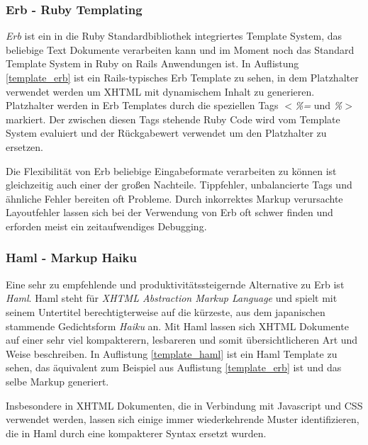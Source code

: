 \subsubsection{Erb - Ruby Templating}

\textit{Erb} ist ein in die Ruby Standardbibliothek integriertes
Template System, das beliebige Text Dokumente verarbeiten kann und im
Moment noch das Standard Template System in Ruby on Rails Anwendungen
ist. In Auflistung \ref{template_erb} ist ein Rails-typisches Erb
Template zu sehen, in dem Platzhalter verwendet werden um XHTML mit
dynamischem Inhalt zu generieren. Platzhalter werden in Erb Templates
durch die speziellen Tags \textit{$<$\%=} und \textit{\%$>$}
markiert. Der zwischen diesen Tags stehende Ruby Code wird vom
Template System evaluiert und der Rückgabe\-wert verwendet um den
Platzhalter zu ersetzen.



Die Flexibilität von Erb beliebige Eingabeformate verarbeiten zu
können ist gleichzeitig auch einer der großen Nachteile. Tippfehler,
unbalancierte Tags und ähnliche Fehler bereiten oft Probleme. Durch
inkorrektes Markup verursachte Layoutfehler lassen sich bei der
Verwendung von Erb oft schwer finden und erforden meist ein
zeitaufwendiges Debugging.

\subsubsection{Haml - Markup Haiku}

Eine sehr zu empfehlende und produktivitätssteigernde Alternative zu
Erb ist \textit{Haml}. Haml steht für \textit{XHTML Abstraction Markup
  Language} und spielt mit seinem Untertitel berechtigterweise auf die
kürzeste, aus dem japanischen stammende Gedichtsform \textit{Haiku}
an. Mit Haml lassen sich XHTML Dokumente auf einer sehr viel
kompakterern, lesbareren und somit übersichtlicheren Art und Weise
beschreiben. In Auflistung \ref{template_haml} ist ein Haml Template
zu sehen, das äquivalent zum Beispiel aus Auflistung
\ref{template_erb} ist und das selbe Markup generiert.



Insbesondere in XHTML Dokumenten, die in Verbindung mit Javascript und
CSS verwendet werden, lassen sich einige immer wiederkehrende Muster
identifizieren, die in Haml durch eine kompakterer Syntax ersetzt
wurden.

